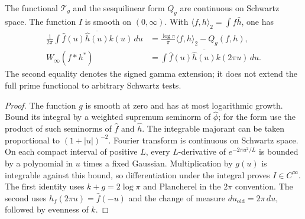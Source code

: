 \begin{proposition}
\label{v4-arith:pres74:aux-continuity}
The functional $\mathcal T_g$ and the sesquilinear form $Q_g$ are
continuous on Schwartz space. The function $I$ is smooth on
$(0,\infty)$. With $\langle f,h\rangle_2=\int f\bar h$, one has
\begin{align*}
 \frac1{2\pi}\int\widehat f(u)\overline{\widehat h(u)}k(u)\,du
   &=\frac{\log\pi}{\pi}\langle f,h\rangle_2-Q_g(f,h),\\
 W_\infty(f*h^*)&=\int\widehat f(u)\overline{\widehat h(u)}k(2\pi u)\,du.
\end{align*}
The second equality denotes the signed gamma extension; it does not
extend the full prime functional to arbitrary Schwartz tests.
\end{proposition}
\begin{proof}
The function $g$ is smooth at zero and has at most logarithmic growth.
Bound its integral by a weighted supremum seminorm of $\widehat\phi$;
for the form use the product of such seminorms of $\widehat f$ and
$\widehat h$. The integrable majorant can be taken proportional to
$(1+|u|)^{-2}$. Fourier transform is continuous on Schwartz space.
On each compact interval of positive $L$, every $L$-derivative of
$e^{-2\pi u^2/L}$ is bounded by a polynomial in $u$ times a fixed
Gaussian. Multiplication by $g(u)$ is integrable against this bound,
so differentiation under the integral proves $I\in C^\infty$.
The first identity uses $k+g=2\log\pi$ and Plancherel in the
$2\pi$ convention. The second uses
$h_f(2\pi u)=\widehat f(-u)$ and the change of measure
$du_{\mathrm{old}}=2\pi\,du$, followed by evenness of $k$.
\end{proof}

